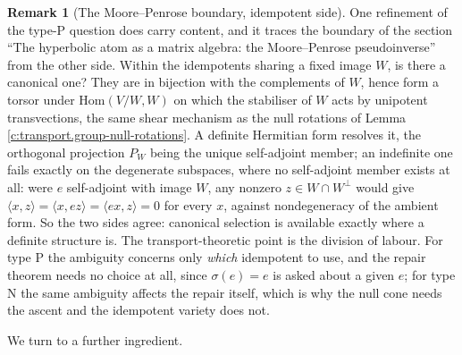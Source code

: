 \documentclass[11pt]{article}
\theoremstyle{definition}
\newtheorem{remark}[theorem]{Remark}
\theoremstyle{plain}
\begin{document}
\begin{remark}[The Moore--Penrose boundary, idempotent side]\label{c:note.transport.moore-penrose-boundary-idempotent-side}
One refinement of the type-P question does carry content, and it traces the boundary of the section ``The hyperbolic atom as a matrix algebra: the Moore--Penrose pseudoinverse'' from the other side. Within the idempotents sharing a fixed image $W$, is there a canonical one? They are in bijection with the complements of $W$, hence form a torsor under $\mathrm{Hom}(V/W, W)$ on which the stabiliser of $W$ acts by unipotent transvections, the same shear mechanism as the null rotations of Lemma \ref{c:transport.group-null-rotations}. A definite Hermitian form resolves it, the orthogonal projection $P_W$ being the unique self-adjoint member; an indefinite one fails exactly on the degenerate subspaces, where no self-adjoint member exists at all: were $e$ self-adjoint with image $W$, any nonzero $z \in W \cap W^{\perp}$ would give $\langle x, z\rangle = \langle x, ez\rangle = \langle ex, z\rangle = 0$ for every $x$, against nondegeneracy of the ambient form. So the two sides agree: canonical selection is available exactly where a definite structure is. The transport-theoretic point is the division of labour. For type P the ambiguity concerns only \emph{which} idempotent to use, and the repair theorem needs no choice at all, since $\sigma(e) = e$ is asked about a given $e$; for type N the same ambiguity affects the repair itself, which is why the null cone needs the ascent and the idempotent variety does not.
\end{remark}

We turn to a further ingredient.
\end{document}
